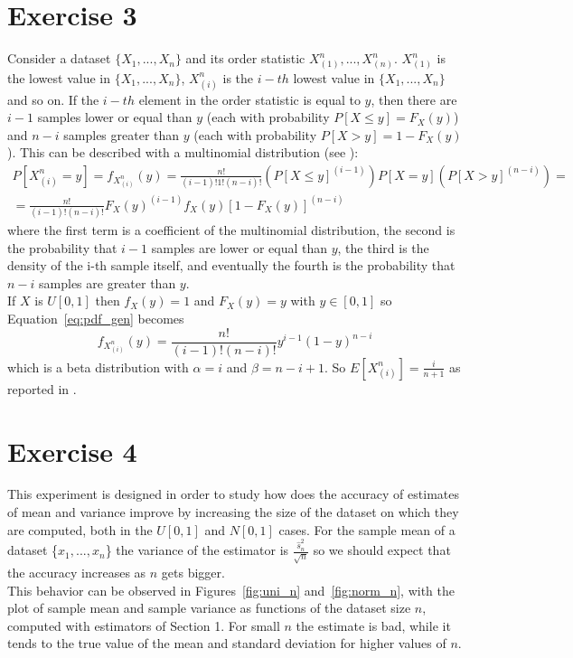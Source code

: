 \documentclass[10pt]{article}
\begin{document}
\section{Exercise 3}
Consider a dataset $\{X_1, ..., X_n\}$ and its order statistic $X_{(1)}^n, ..., X_{(n)}^n$. $X_{(1)}^n$ is the lowest value in $\{X_1, ..., X_n\}$, $X_{(i)}^n$ is the $i-th$ lowest value in $\{X_1, ..., X_n\}$ and so on. If the $i-th$ element in the order statistic is equal to $y$, then there are $i-1$ samples lower or equal than $y$ (each with probability $P[X\le y] = F_X(y)$) and $n-i$ samples greater than $y$ (each with probability $P[X > y] = 1 - F_X(y)$). This can be described with a multinomial distribution (see \cite{pk}):
\begin{multline}
P[X_{(i)}^n = y] = f_{X_{(i)}^n}(y) = \frac{n!}{(i-1)!1!(n-i)!}(P[X\le y]^{(i-1)}) P[X = y] (P[X > y]^{(n-i)}) = \\ = \frac{n!}{(i-1)!(n-i)!} F_X(y)^{(i-1)} f_X(y) [1-F_X(y)]^{(n-i)}
\label{eq:pdf_gen}
\end{multline}
where the first term is a coefficient of the multinomial distribution, the second is the probability that $i - 1$ samples are lower or equal than $y$, the third is the density of the i-th sample itself, and eventually the fourth is the probability that $n - i$ samples are greater than $y$. \\
If $X$ is $U[0,1]$ then $f_X(y) = 1$ and $F_X(y) = y$ with $y \in [0,1]$ so Equation~\ref{eq:pdf_gen} becomes
\begin{equation}
  f_{X_{(i)}^n}(y) = \frac{n!}{(i-1)!(n-i)!} y^{i-1} (1-y)^{n-i}
\end{equation}
which is a beta distribution with $\alpha = i$ and $\beta = n - i + 1$. So $E[X_{(i)}^n]= \frac{i}{n+1}$ as reported in \cite{pk}.


\section{Exercise 4}
This experiment is designed in order to study how does the accuracy of estimates of mean and variance improve by increasing the size of the dataset on which they are computed, both in the $U[0,1]$ and $N[0,1]$ cases. For the sample mean of a dataset \{$x_1, ... , x_n$\} the variance of the estimator is $\frac{\hat{s}^2_n}{\sqrt{n}}$ so we should expect that the accuracy increases as $n$ gets bigger. \\
This behavior can be observed in Figures~\ref{fig:uni_n} and~\ref{fig:norm_n}, with the plot of sample mean and sample variance as functions of the dataset size $n$, computed with estimators of Section 1. For small $n$ the estimate is bad, while it tends to the true value of the mean and standard deviation for higher values of $n$. \\
\end{document}
